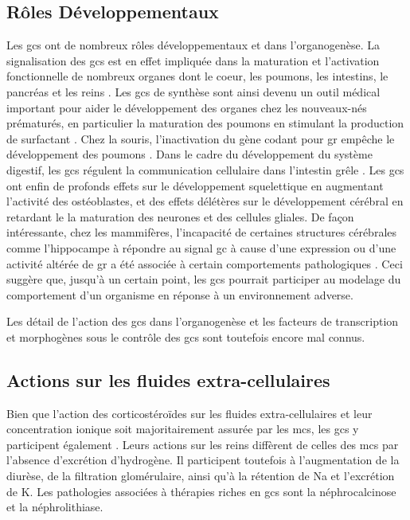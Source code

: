 \documentclass[../main.tex]{subfiles}
\begin{document}
\subsection{Rôles Développementaux}
Les \glspl{gc} ont de nombreux rôles développementaux et dans l'organogenèse.
La signalisation des \glspl{gc} est en effet impliquée dans la maturation et l'activation fonctionnelle de nombreux organes dont le coeur, les poumons, les intestins, le pancréas et les reins \citep{Majumdar1985,Liggins1994,Pierce1995,Gesina2004}.
Les \glspl{gc} de synthèse sont ainsi devenu un outil médical important pour aider le développement des organes chez les nouveaux-nés prématurés, en particulier la maturation des poumons \citep{Becker2001} en stimulant la production de surfactant \citep{Bolt2001}.
Chez la souris, l'inactivation du gène codant pour \gls{gr} empêche le développement des poumons \citep{Cole2001}.
Dans le cadre du développement du système digestif, les \glspl{gc} régulent la communication cellulaire dans l'intestin grêle \citep{Schaeffer2000}.
Les \glspl{gc} ont enfin de profonds effets sur le développement squelettique en augmentant l'activité des ostéoblastes, et des effets délétères sur le développement cérébral en retardant le la maturation des neurones et des cellules gliales.
De façon intéressante, chez les mammifères, l'incapacité de certaines structures cérébrales comme l'hippocampe à répondre au signal \gls{gc} à cause d'une expression ou d'une activité altérée de \gls{gr} a été associée à certain comportements pathologiques \citep{Liu1997,McGowan2009,Zhang2013}.
Ceci suggère que, jusqu'à un certain point, les \glspl{gc} pourrait participer au modelage du comportement d'un organisme en réponse à un environnement adverse.
\par
Les détail de l'action des \glspl{gc} dans l'organogenèse et les facteurs de transcription et morphogènes sous le contrôle des \glspl{gc} sont toutefois encore mal connus.


\subsection{Actions sur les fluides extra-cellulaires}
Bien que l'action des corticostéroïdes sur les fluides extra-cellulaires et leur concentration ionique soit majoritairement assurée par les \glspl{mc}, les \glspl{gc} y participent également \citep{McKay2003}.
Leurs actions sur les reins diffèrent de celles des \glspl{mc} par l'absence d'excrétion d'hydrogène.
Il participent toutefois à l'augmentation de la diurèse, de la filtration glomérulaire, ainsi qu'à la rétention de \gls{Na} et l'excrétion de \gls{K}.
Les pathologies associées à thérapies riches en \glspl{gc} sont la néphrocalcinose et la néphrolithiase.
\end{document}

